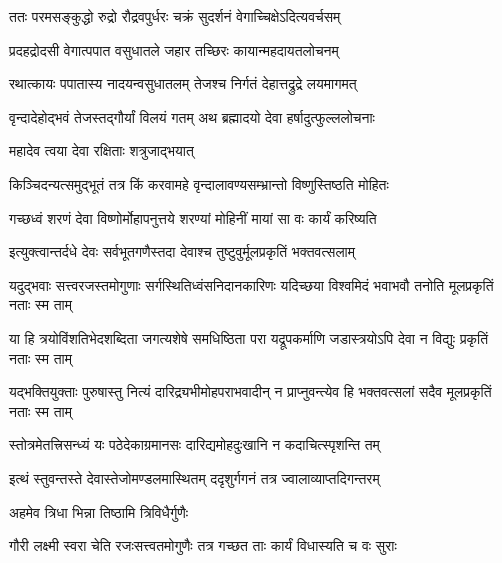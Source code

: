 \twolineshloka
{ततः परमसङ्कुद्धो रुद्रो रौद्रवपुर्धरः}
{चक्रं सुदर्शनं वेगाच्चिक्षेऽदित्यवर्चसम्} %

\twolineshloka
{प्रदहद्रोदसी वेगात्पपात वसुधातले}
{जहार तच्छिरः कायान्महदायतलोचनम्} %

\twolineshloka
{रथात्कायः पपातास्य नादयन्वसुधातलम्}
{तेजश्च निर्गतं देहात्तद्रुद्रे लयमागमत्} %

\twolineshloka
{वृन्दादेहोद्भवं तेजस्तद्गौर्यां विलयं गतम्}
{अथ ब्रह्मादयो देवा हर्षादुत्फुल्ललोचनाः} %




\onelineshloka
{महादेव त्वया देवा रक्षिताः शत्रुजाद्भयात्} %

\twolineshloka
{किञ्चिदन्यत्समुद्भूतं तत्र किं करवामहे}
{वृन्दालावण्यसम्भ्रान्तो विष्णुस्तिष्ठति मोहितः} %


\twolineshloka
{गच्छध्वं शरणं देवा विष्णोर्मोहापनुत्तये}
{शरण्यां मोहिनीं मायां सा वः कार्यं करिष्यति} %


\twolineshloka
{इत्युक्त्वान्तर्दधे देवः सर्वभूतगणैस्तदा}
{देवाश्च तुष्टुवुर्मूलप्रकृतिं भक्तवत्सलाम्} %


\twolineshloka
{यदुद्भवाः सत्त्वरजस्तमोगुणाः सर्गस्थितिध्वंसनिदानकारिणः}
{यदिच्छया विश्वमिदं भवाभवौ तनोति मूलप्रकृतिं नताः स्म ताम्} %

\twolineshloka
{या हि त्रयोविंशतिभेदशब्दिता जगत्यशेषे समधिष्ठिता परा}
{यद्रूपकर्माणि जडास्त्रयोऽपि देवा न विद्युः प्रकृतिं नताः स्म ताम्} %

\twolineshloka
{यद्भक्तियुक्ताः पुरुषास्तु नित्यं दारिद्र्यभीमोहपराभवादीन्}
{न प्राप्नुवन्त्येव हि भक्तवत्सलां सदैव मूलप्रकृतिं नताः स्म ताम्} %


\twolineshloka
{स्तोत्रमेतत्त्रिसन्ध्यं यः पठेदेकाग्रमानसः}
{दारिद्यमोहदुःखानि न कदाचित्स्पृशन्ति तम्} %

\twolineshloka
{इत्थं स्तुवन्तस्ते देवास्तेजोमण्डलमास्थितम्}
{ददृशुर्गगनं तत्र ज्वालाव्याप्तदिगन्तरम्} %




\onelineshloka
{अहमेव त्रिधा भिन्ना तिष्ठामि त्रिविधैर्गुणैः} %

\twolineshloka
{गौरी लक्ष्मी स्वरा चेति रजःसत्त्वतमोगुणैः}
{तत्र गच्छत ताः कार्यं विधास्यति च वः सुराः} %


